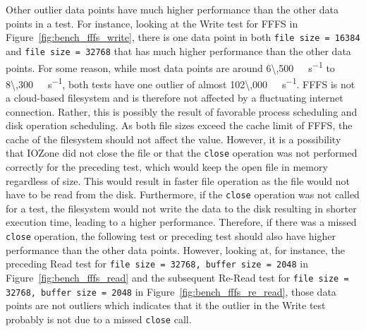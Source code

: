 Other outlier data points have much higher performance than the other data points in a test. For instance, looking at the Write test for \gls{FFFS} in Figure~\ref{fig:bench_fffs_write}, there is one data point in both \texttt{file size = 16384} and \texttt{file size = 32768} that has much higher performance than the other data points. For some reason, while most data points are around \SI[per-mode = symbol]{6\,500}{\kilo\byte\per\second} to \SI[per-mode = symbol]{8\,300}{\kilo\byte\per\second}, both tests have one outlier of almost \SI[per-mode = symbol]{102\,000}{\kilo\byte\per\second}. \gls{FFFS} is not a cloud-based filesystem and is therefore not affected by a fluctuating internet connection. Rather, this is possibly the result of favorable process scheduling and disk operation scheduling. As both file sizes exceed the cache limit of \gls{FFFS}, the cache of the filesystem should not affect the value. However, it is a possibility that IOZone did not close the file or that the \texttt{close} operation was not performed correctly for the preceding test, which would keep the open file in memory regardless of size. This would result in faster file operation as the file would not have to be read from the disk. Furthermore, if the \texttt{close} operation was not called for a test, the filesystem would not write the data to the disk resulting in shorter execution time, leading to a higher performance. Therefore, if there was a missed \texttt{close} operation, the following test or preceding test should also have higher performance than the other data points. However, looking at, for instance, the preceding Read test for \texttt{file size = 32768, buffer size = 2048} in Figure~\ref{fig:bench_fffs_read} and the subsequent \mbox{Re-Read} test for \texttt{file size = 32768, buffer size = 2048} in Figure~\ref{fig:bench_fffs_re_read}, those data points are not outliers which indicates that it the outlier in the Write test probably is not due to a missed \texttt{close} call.

